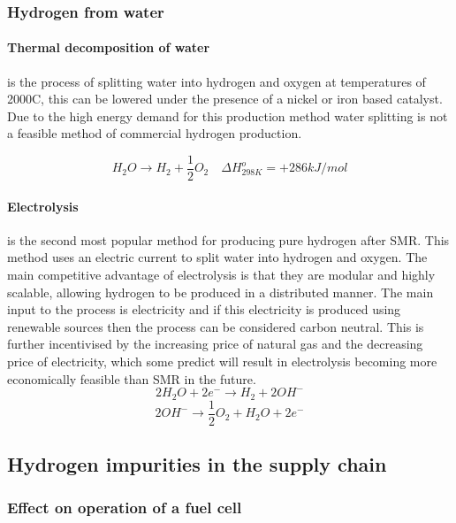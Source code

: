 \subsubsection{Hydrogen from water}
\paragraph{Thermal decomposition of water}
is the process of splitting water into hydrogen and oxygen at temperatures of 2000\textdegree C, 
this can be lowered under the presence of a nickel or iron based catalyst. 
Due to the high energy demand for this production method water splitting is not a feasible method of 
commercial hydrogen production.

\begin{equation}
    H_2 O \rightarrow H_2 + \frac{1}{2} O_2  \quad \Delta H_{298K}^o = +286 kJ/mol
\end{equation}

\paragraph{Electrolysis}
is the second most popular method for producing pure hydrogen after SMR. 
This method uses an electric current to split water into hydrogen and oxygen. 
The main competitive advantage of electrolysis is that they are modular and highly scalable, 
allowing hydrogen to be produced in a distributed manner. 
The main input to the process is electricity and if this electricity is produced using renewable sources 
then the process can be considered carbon neutral. 
This is further incentivised by the increasing price of natural gas and the decreasing price of electricity, 
which some predict will result in electrolysis becoming more economically feasible than SMR in the future. 
\begin{equation}
2H_2 O +  2e^- \rightarrow H_2 + 2OH^-
\end{equation}
\begin{equation}
2OH^- \rightarrow \frac{1}{2}O_2+ H_2 O + 2e^-
\end{equation}


\subsection{Hydrogen impurities in the supply chain}

\subsubsection{Effect on operation of a fuel cell}


